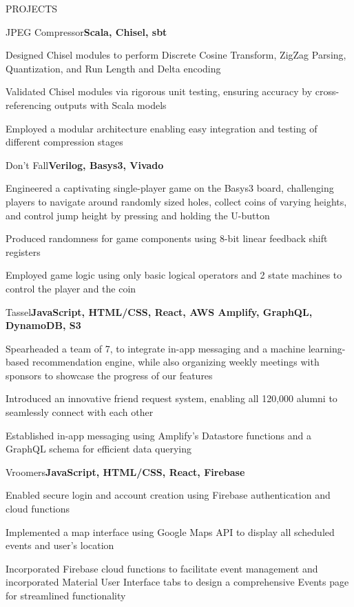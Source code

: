 \documentclass[]{resume}
\begin{document}
\begin{section}{PROJECTS}
\begin{subsection}{JPEG Compressor}{}{\textbf{Scala, Chisel, sbt}}{}
    \item Designed Chisel modules to perform Discrete Cosine Transform, ZigZag Parsing, Quantization, and Run Length and Delta encoding
    \item Validated Chisel modules via rigorous unit testing, ensuring accuracy by cross-referencing outputs with Scala models
    \item Employed a modular architecture enabling easy integration and testing of different compression stages
\end{subsection}
\begin{subsection}{Don't Fall}{}{\textbf{Verilog, Basys3, Vivado}}{}
    \item Engineered a captivating single-player game on the Basys3 board, challenging players to navigate around randomly sized holes, collect coins of varying heights, and control jump height by pressing and holding the U-button
    \item Produced randomness for game components using 8-bit linear feedback shift registers
    \item Employed game logic using only basic logical operators and 2 state machines to control the player and the coin
\end{subsection}
\begin{subsection}{Tassel}{}{\textbf{JavaScript, HTML/CSS, React, AWS Amplify, GraphQL, DynamoDB, S3}}{}
    \item Spearheaded a team of 7, to integrate in-app messaging and a machine learning-based recommendation engine, while also organizing weekly meetings with sponsors to showcase the progress of our features
    \item Introduced an innovative friend request system, enabling all 120,000 alumni to seamlessly connect with each other
    \item Established in-app messaging using Amplify's Datastore functions and a GraphQL schema for efficient data querying
\end{subsection}
\begin{subsection}{Vroomers}{}{\textbf{JavaScript, HTML/CSS, React, Firebase}}{}
    \item Enabled secure login and account creation using Firebase authentication and cloud functions
    \item Implemented a map interface using Google Maps API to display all scheduled events and user's location
    \item Incorporated Firebase cloud functions to facilitate event management and incorporated Material User Interface tabs to design a comprehensive Events page for streamlined functionality
\end{subsection}
\end{section}

\end{document}
